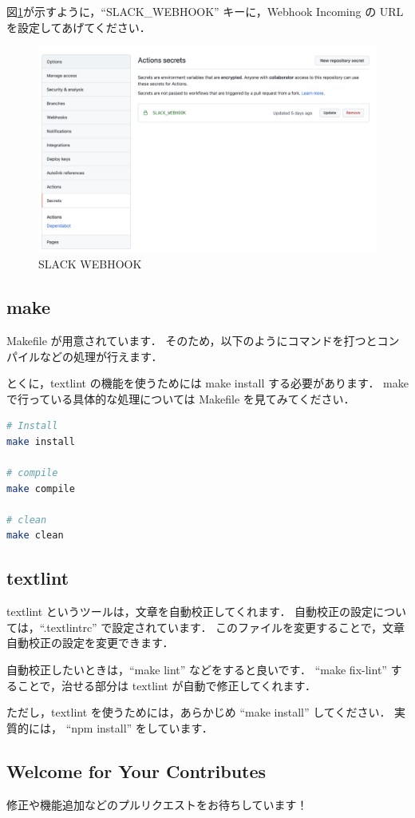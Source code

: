 図\ref{fig:introduction_slack_webhook}が示すように，``SLACK\_WEBHOOK'' キーに，Webhook Incoming の URL を設定してあげてください．

\begin{figure}[H]
    \centering
    \includegraphics[width=0.6\linewidth]{static/introduction/slack_webhook.png}
    \caption{SLACK WEBHOOK}
    \label{fig:introduction_slack_webhook}
\end{figure}

\subsection{make}

Makefile が用意されています．
そのため，以下のようにコマンドを打つとコンパイルなどの処理が行えます．

とくに，textlint の機能を使うためには make install する必要があります．
make で行っている具体的な処理については Makefile を見てみてください．

\begin{lstlisting}[language=bash,caption={Makefile}]
# Install
make install

# compile
make compile

# clean
make clean
\end{lstlisting}

\subsection{textlint}

textlint というツールは，文章を自動校正してくれます．
自動校正の設定については，``.textlintrc'' で設定されています．
このファイルを変更することで，文章自動校正の設定を変更できます．

自動校正したいときは，``make lint'' などをすると良いです．
``make fix-lint'' することで，治せる部分は textlint が自動で修正してくれます．

ただし，textlint を使うためには，あらかじめ ``make install'' してください．
実質的には， ``npm install'' をしています．

\subsection{Welcome for Your Contributes}

修正や機能追加などのプルリクエストをお待ちしています！
